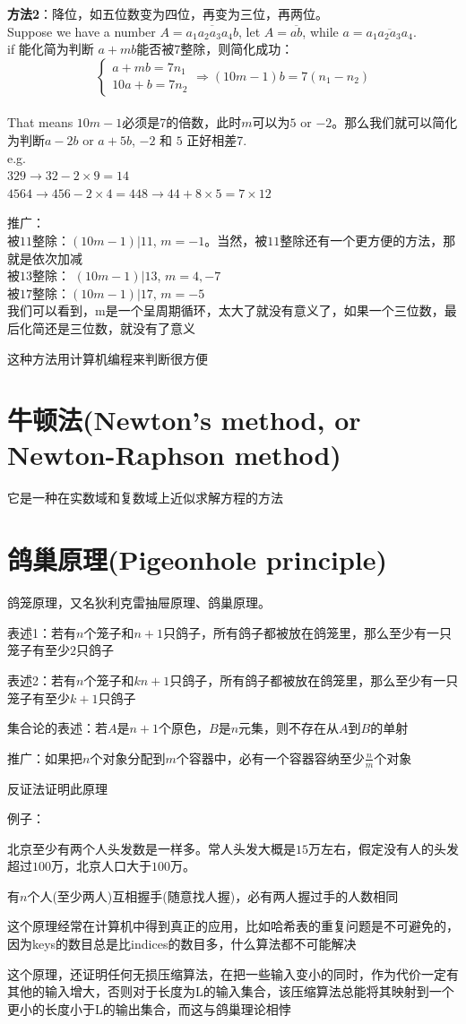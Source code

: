 \documentclass[../main.tex]{subfiles}
\begin{document}
\textbf{方法2}：降位，如五位数变为四位，再变为三位，再两位。\\
Suppose we have a number $A=\overline{a_1a_2a_3a_4b}$, let $A=\overline{ab}$, while $a=\overline{a_1a_2a_3a_4}$.\\
if 能化简为判断 $a+mb$能否被7整除，则简化成功：\\
\[
\begin{cases}
  a + mb = 7n_1\\
  10a + b = 7n_2
\end{cases}
\Rightarrow
(10m-1)b = 7(n_1-n_2)
\]
\\
That means $10m-1$必须是7的倍数，此时$m$可以为$5$ or $-2$。那么我们就可以简化为判断$a-2b$ or $a+5b$, $-2$ 和 $5$ 正好相差7.\\
e.g.\\
$329 \to 32-2\times 9=14 $ \\
$4564 \to 456-2\times 4=448 \to 44+8\times 5=7\times 12$

推广：\\
被$11$整除：$(10m-1)|11$, $m=-1$。当然，被$11$整除还有一个更方便的方法，那就是依次加减\\
被$13$整除： $(10m-1)|13$, $m=4,-7$\\
被$17$整除：$(10m-1)|17$, $m=-5$\\
我们可以看到，m是一个呈周期循环，太大了就没有意义了，如果一个三位数，最后化简还是三位数，就没有了意义

这种方法用计算机编程来判断很方便

\section{牛顿法(Newton's method, or Newton-Raphson method)}
它是一种在实数域和复数域上近似求解方程的方法

\section{鸽巢原理(Pigeonhole principle)}

鸽笼原理，又名狄利克雷抽屉原理、鸽巢原理。

表述1：若有$n$个笼子和$n+1$只鸽子，所有鸽子都被放在鸽笼里，那么至少有一只笼子有至少$2$只鸽子

表述2：若有$n$个笼子和$kn+1$只鸽子，所有鸽子都被放在鸽笼里，那么至少有一只笼子有至少$k+1$只鸽子

集合论的表述：若$A$是$n+1$个原色，$B$是$n$元集，则不存在从$A$到$B$的单射

推广：如果把$n$个对象分配到$m$个容器中，必有一个容器容纳至少$\frac{n}{m}$个对象

反证法证明此原理

例子：

北京至少有两个人头发数是一样多。常人头发大概是$15$万左右，假定没有人的头发超过$100$万，北京人口大于$100$万。

有$n$个人(至少两人)互相握手(随意找人握)，必有两人握过手的人数相同

这个原理经常在计算机中得到真正的应用，比如哈希表的重复问题是不可避免的，因为keys的数目总是比indices的数目多，什么算法都不可能解决

这个原理，还证明任何无损压缩算法，在把一些输入变小的同时，作为代价一定有其他的输入增大，否则对于长度为L的输入集合，该压缩算法总能将其映射到一个更小的长度小于L的输出集合，而这与鸽巢理论相悖

\end{document}
